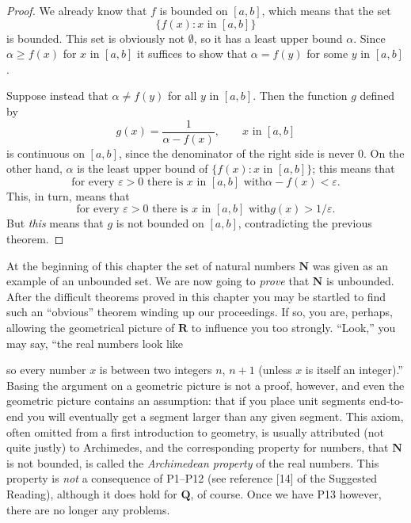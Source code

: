 \begin{proof}
We already know that $f$ is bounded on $[a,b]$, which means that the set
\[
\{f(x) : x\text{ in }[a,b]\}
\]
is bounded. This set is obviously not $\emptyset$, so it has a least upper
bound $\alpha$. Since $\alpha \geq f(x)$ for $x$ in $[a,b]$ it suffices to
show that $\alpha = f(y)$ for some $y$ in $[a,b]$.

Suppose instead that $\alpha \neq f(y)$ for all $y$ in $[a,b]$. Then the
function $g$ defined by
\[
g(x) = \frac{1}{\alpha - f(x)}, \qquad x\text{ in }[a,b]
\]
is continuous on $[a,b]$, since the denominator of the right side is never
$0$. On the other hand, $\alpha$ is the least upper bound of
$\{f(x) : x\text{ in }[a,b]\}$; this means that
\[
\text{for every $\varepsilon > 0$ there is $x$ in $[a,b]$ with
$\alpha - f(x) < \varepsilon$.}
\]
This, in turn, means that
\[
\text{for every $\varepsilon > 0$ there is $x$ in $[a,b]$ with
$g(x) > 1/\varepsilon$.}
\]
But \emph{this} means that $g$ is not bounded on $[a,b]$, contradicting the
previous theorem.
\end{proof}

At the beginning of this chapter the set of natural numbers $\mathbf{N}$ was
given as an example of an unbounded set. We are now going to \emph{prove}
that $\mathbf{N}$ is unbounded. After the difficult theorems proved in this
chapter you may be startled to find such an ``obvious'' theorem winding up
our proceedings. If so, you are, perhaps, allowing the geometrical picture
of $\mathbf{R}$ to influence you too strongly. ``Look,'' you may say, ``the
real numbers look like
\begin{center}
\end{center}
so every number $x$ is between two integers $n$, $n+1$ (unless $x$ is itself
an integer).'' Basing the argument on a geometric picture is not a proof,
however, and even the geometric picture contains an assumption: that if you
place unit segments end-to-end you will eventually get a segment larger than
any given segment. This axiom, often omitted from a first introduction to
geometry, is usually attributed (not quite justly) to Archimedes, and the
corresponding property for numbers, that $\mathbf{N}$ is not bounded, is
called the \emph{Archimedean property} of the real numbers. This property is
\emph{not} a consequence of P1--P12 (see reference [14] of the Suggested
Reading), although it does hold for $\mathbf{Q}$, of course. Once we have
P13 however, there are no longer any problems.

